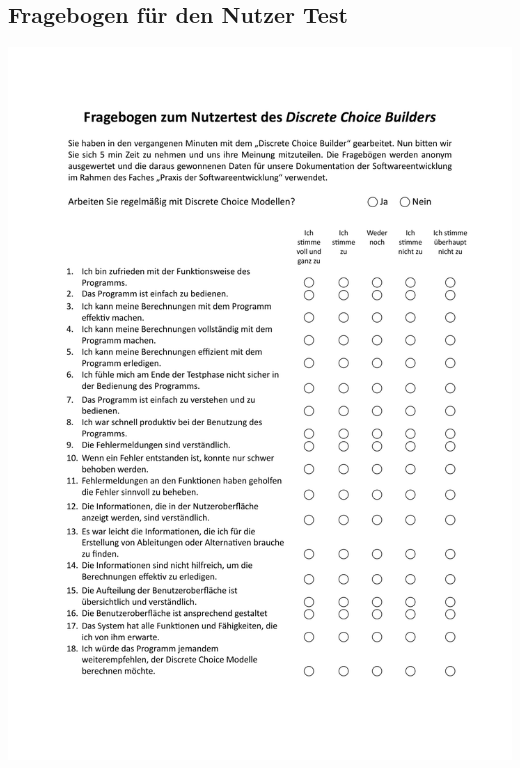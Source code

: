 \documentclass{article}
\begin{document}
\subsection{Fragebogen für den Nutzer Test}
\includegraphics[width=1\textwidth,height=1\textheight]{ressources/NutzertestsFragebogen.pdf}
\newpage
\end{document}
